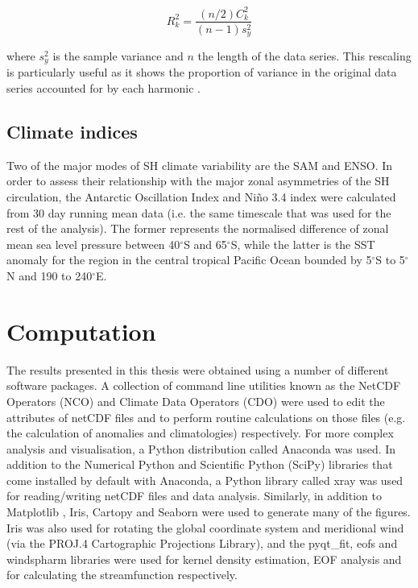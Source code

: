 \begin{equation}\label{eq:variance_explained}
R_k^2 = \frac{(n/2)C_k^2}{(n-1)s_y^2}
\end{equation}

\noindent where $s_y^2$ is the sample variance and $n$ the length of the data series. This rescaling is particularly useful as it shows the proportion of variance in the original data series accounted for by each harmonic \citep{Wilks2011}.

\subsection{Climate indices}
Two of the major modes of SH climate variability are the SAM and ENSO. In order to assess their relationship with the major zonal asymmetries of the SH circulation, the Antarctic Oscillation Index \citep[AOI;][]{Gong1999} and Ni\~{n}o 3.4 index \citep{Trenberth2001} were calculated from 30 day running mean data (i.e. the same timescale that was used for the rest of the analysis). The former represents the normalised difference of zonal mean sea level pressure between 40$^{\circ}$S and 65$^{\circ}$S, while the latter is the SST anomaly for the region in the central tropical Pacific Ocean bounded by 5$^{\circ}$S to 5$^{\circ}$N and 190 to 240$^{\circ}$E. 


\section{Computation}\label{s:computation}


The results presented in this thesis were obtained using a number of different software packages. A collection of command line utilities known as the NetCDF Operators (NCO) and Climate Data Operators (CDO) were used to edit the attributes of netCDF files and to perform routine calculations on those files (e.g. the calculation of anomalies and climatologies) respectively. For more complex analysis and visualisation, a Python distribution called Anaconda was used. In addition to the Numerical Python \citep[NumPy;][]{VanDerWalt2011} and Scientific Python (SciPy) libraries that come installed by default with Anaconda, a Python library called xray was used for reading/writing netCDF files and data analysis. Similarly, in addition to Matplotlib \citep[the default Python plotting library;][]{Hunter2007}, Iris, Cartopy and Seaborn were used to generate many of the figures. Iris was also used for rotating the global coordinate system and meridional wind (via the PROJ.4 Cartographic Projections Library), and the pyqt\_fit, eofs and windspharm libraries were used for kernel density estimation, EOF analysis and for calculating the streamfunction respectively.

